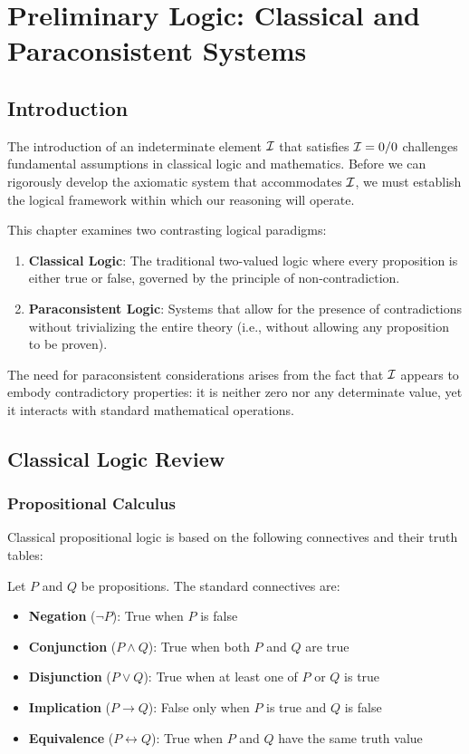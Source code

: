 \chapter{Preliminary Logic: Classical and Paraconsistent Systems}
\label{ch:preliminary-logic}

\section{Introduction}

The introduction of an indeterminate element $\mathcal{I}$ that satisfies $\mathcal{I} = 0/0$ challenges fundamental assumptions in classical logic and mathematics. Before we can rigorously develop the axiomatic system that accommodates $\mathcal{I}$, we must establish the logical framework within which our reasoning will operate.

This chapter examines two contrasting logical paradigms:
\begin{enumerate}
    \item \textbf{Classical Logic}: The traditional two-valued logic where every proposition is either true or false, governed by the principle of non-contradiction.
    \item \textbf{Paraconsistent Logic}: Systems that allow for the presence of contradictions without trivializing the entire theory (i.e., without allowing any proposition to be proven).
\end{enumerate}

The need for paraconsistent considerations arises from the fact that $\mathcal{I}$ appears to embody contradictory properties: it is neither zero nor any determinate value, yet it interacts with standard mathematical operations.

\section{Classical Logic Review}

\subsection{Propositional Calculus}

Classical propositional logic is based on the following connectives and their truth tables:

\begin{definition}
Let $P$ and $Q$ be propositions. The standard connectives are:
\begin{itemize}
    \item \textbf{Negation} ($\neg P$): True when $P$ is false
    \item \textbf{Conjunction} ($P \land Q$): True when both $P$ and $Q$ are true
    \item \textbf{Disjunction} ($P \lor Q$): True when at least one of $P$ or $Q$ is true
    \item \textbf{Implication} ($P \rightarrow Q$): False only when $P$ is true and $Q$ is false
    \item \textbf{Equivalence} ($P \leftrightarrow Q$): True when $P$ and $Q$ have the same truth value
\end{itemize}
\end{definition}

